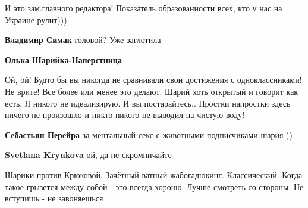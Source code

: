\begin{itemize}
\begin{itemize}
И это зам.главного редактора! Показатель образованности всех, кто у нас на Украине рулит)))

 
\textbf{Владимир Симак} головой? Уже заглотила

 
\textbf{Олька Шарийка-Наперстница} 

Ой, ой! Будто бы вы никогда не сравнивали свои достижения с одноклассниками! Не
врите! Все более или менее это делают. Шарий хоть открытый и говорит как есть.
Я никого не идеализирую. И вы постарайтесь.. Простки напростки здесь ничего не
произошло и никто никого не выводил на чистую воду!

 
\textbf{Себастьян Перейра} за ментальный секс с животными-подписчиками шария ))

 
\textbf{Svetlana Kryukova} ой, да не скромничайте

 

\obeycr
Шарики против Крюковой.
Зачётный ватный жабогадюкинг.
Классический.
Когда такое грызется между собой - это всегда хорошо.
Лучше смотреть со стороны.
Не вступишь - не завоняешься \Smiley[1.0][yellow]
\restorecr

 

\end{itemize}
\end{itemize}
